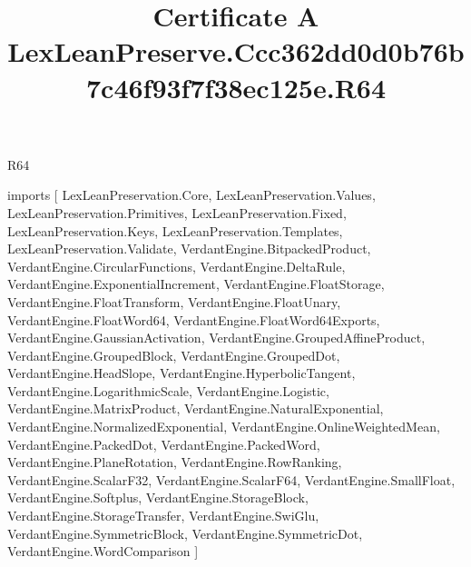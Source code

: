 \begin{lexlean}{R64}
\title{Certificate A LexLeanPreserve.Ccc362dd0d0b76b7c46f93f7f38ec125e.R64}
\begin{coremodule}
imports [
  LexLeanPreservation.Core,
  LexLeanPreservation.Values,
  LexLeanPreservation.Primitives,
  LexLeanPreservation.Fixed,
  LexLeanPreservation.Keys,
  LexLeanPreservation.Templates,
  LexLeanPreservation.Validate,
  VerdantEngine.BitpackedProduct,
  VerdantEngine.CircularFunctions,
  VerdantEngine.DeltaRule,
  VerdantEngine.ExponentialIncrement,
  VerdantEngine.FloatStorage,
  VerdantEngine.FloatTransform,
  VerdantEngine.FloatUnary,
  VerdantEngine.FloatWord64,
  VerdantEngine.FloatWord64Exports,
  VerdantEngine.GaussianActivation,
  VerdantEngine.GroupedAffineProduct,
  VerdantEngine.GroupedBlock,
  VerdantEngine.GroupedDot,
  VerdantEngine.HeadSlope,
  VerdantEngine.HyperbolicTangent,
  VerdantEngine.LogarithmicScale,
  VerdantEngine.Logistic,
  VerdantEngine.MatrixProduct,
  VerdantEngine.NaturalExponential,
  VerdantEngine.NormalizedExponential,
  VerdantEngine.OnlineWeightedMean,
  VerdantEngine.PackedDot,
  VerdantEngine.PackedWord,
  VerdantEngine.PlaneRotation,
  VerdantEngine.RowRanking,
  VerdantEngine.ScalarF32,
  VerdantEngine.ScalarF64,
  VerdantEngine.SmallFloat,
  VerdantEngine.Softplus,
  VerdantEngine.StorageBlock,
  VerdantEngine.StorageTransfer,
  VerdantEngine.SwiGlu,
  VerdantEngine.SymmetricBlock,
  VerdantEngine.SymmetricDot,
  VerdantEngine.WordComparison
]


\end{coremodule}
\end{lexlean}
